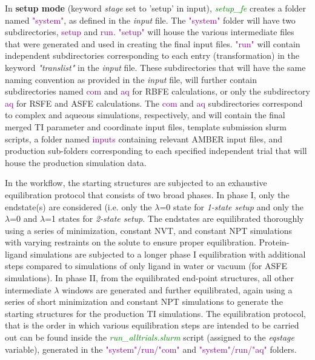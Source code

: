 \documentclass[11pt,letterpaper,titlepage]{article}
\begin{document}
In \textbf{setup mode} (keyword \textit{stage} set to 'setup' in input), 
\textcolor{green}{\textit{setup\_fe}} creates a folder named \textcolor{purple}{"system"}, as defined 
in the \textit{input} file. 
The \textcolor{purple}{"system"} folder will have two subdirectories, \textcolor{purple}{setup} 
and \textcolor{purple}{run}. \textcolor{purple}{"setup"} will house the  various intermediate 
files that were generated and used in creating 
the final input files. \textcolor{purple}{"run"} will contain independent subdirectories corresponding 
to each entry (transformation) in the keyword \textit{"translist"} in the \textit{input} file. These 
subdirectories that will have the same naming convention as provided in the \textit{input} file, 
will further contain subdirectories named \textcolor{purple}{com} and \textcolor{purple}{aq} for 
RBFE calculations, or only the subdirectory \textcolor{purple}{aq} for RSFE and ASFE calculations. 
The \textcolor{purple}{com} and \textcolor{purple}{aq}
subdirectories correspond to complex and aqueous simulations, respectively, and will contain 
the final merged TI parameter and coordinate input files, template submission slurm scripts, a folder
named \textcolor{purple}{inputs} containing relevant AMBER input files, and production sub-folders corresponding 
to each specified independent trial that will house the production simulation data. 

\vspace{0.1cm}

In the workflow, the starting structures are subjected to an exhaustive equilibration protocol
that consists of two broad phases. In phase I, only the endstate(s) are considered (i.e. only the
$\lambda$=0 state for \textit{1-state setup} and only the $\lambda$=0 and $\lambda$=1 states for 
\textit{2-state setup}. The endstates are equilibrated thoroughly using a series of minimization, 
constant NVT, and constant NPT simulations with varying restraints on the solute to ensure proper
equilibration. Protein-ligand simulations are subjected to a longer phase I equilibration with 
additional steps compared to simulations of only ligand in water or vacuum (for ASFE simulations). 
In phase II, from the equilibrated end-point structures, all other intermediate 
$\lambda$ windows are generated and further equilibrated, again using a series of short minimization
and constant NPT simulations to generate the starting structures for the production TI simulations.
The equilibration protocol, that is the order in which various equilibration steps are intended to be 
carried out can be found inside the \textcolor{green}{\textit{run\_alltrials.slurm}} script (assigned to the 
\textit{eqstage} variable), generated in the \textcolor{purple}{"system"/run/"com"} and 
\textcolor{purple}{"system"/run/"aq"} folders.
\end{document}

